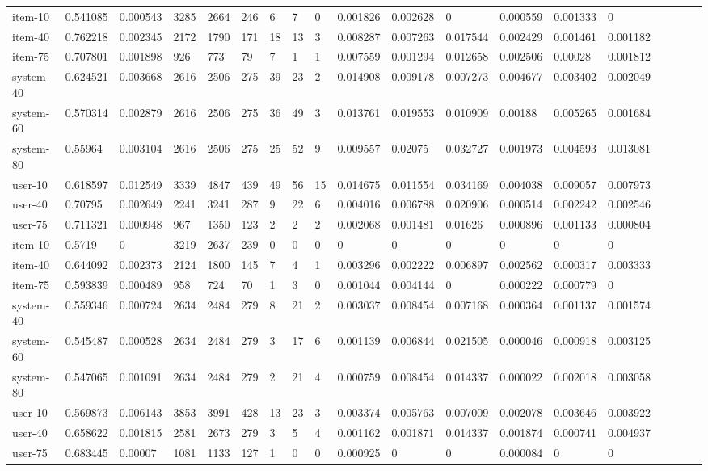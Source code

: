 \begin{table}
{\begin{tabular}{*{19}l}
item-10		&	0.541085 &	0.000543 &	3285 &	2664 &	246 &	6 &	7 &	0 &	0.001826 &	0.002628 &	0 &	0.000559 &	0.001333 &	0 &	 \\
item-40		&	0.762218 &	0.002345 &	2172 &	1790 &	171 &	18 &	13 &	3 &	0.008287 &	0.007263 &	0.017544 &	0.002429 &	0.001461 &	0.001182 &	 \\
item-75		&	0.707801 &	0.001898 &	926 &	773 &	79 &	7 &	1 &	1 &	0.007559 &	0.001294 &	0.012658 &	0.002506 &	0.00028 &	0.001812 &	 \\
system-40	&	0.624521 &	0.003668 &	2616 &	2506 &	275 &	39 &	23 &	2 &	0.014908 &	0.009178 &	0.007273 &	0.004677 &	0.003402 &	0.002049 &	 \\
system-60	&	0.570314 &	0.002879 &	2616 &	2506 &	275 &	36 &	49 &	3 &	0.013761 &	0.019553 &	0.010909 &	0.00188 &	0.005265 &	0.001684 &	 \\
system-80	&	0.55964  &	0.003104 &	2616 &	2506 &	275 &	25 &	52 &	9 &	0.009557 &	0.02075 &	0.032727 &	0.001973 &	0.004593 &	0.013081 &	 \\
user-10		&	0.618597 &	0.012549 &	3339 &	4847 &	439 &	49 &	56 &	15 &	0.014675 &	0.011554 &	0.034169 &	0.004038 &	0.009057 &	0.007973 &	 \\
user-40		&	0.70795  &	0.002649 &	2241 &	3241 &	287 &	9 &	22 &	6 &	0.004016 &	0.006788 &	0.020906 &	0.000514 &	0.002242 &	0.002546 &	 \\
user-75		&	0.711321 &	0.000948 &	967 &	1350 &	123 &	2 &	2 &	2 &	0.002068 &	0.001481 &	0.01626 &	0.000896 &	0.001133 &	0.000804 &	 \\

item-10		&	0.5719 &	0 &	3219 &	2637 &	239 &	0 &	0 &	0 &	0 &	0 &	0 &	0 &	0 &	0 &	 \\
item-40		&	0.644092 &	0.002373 &	2124 &	1800 &	145 &	7 &	4 &	1 &	0.003296 &	0.002222 &	0.006897 &	0.002562 &	0.000317 &	0.003333 &	 \\
item-75		&	0.593839 &	0.000489 &	958 &	724 &	70 &	1 &	3 &	0 &	0.001044 &	0.004144 &	0 &	0.000222 &	0.000779 &	0 &	 \\
system-40	&	0.559346 &	0.000724 &	2634 &	2484 &	279 &	8 &	21 &	2 &	0.003037 &	0.008454 &	0.007168 &	0.000364 &	0.001137 &	0.001574 &	 \\
system-60	&	0.545487 &	0.000528 &	2634 &	2484 &	279 &	3 &	17 &	6 &	0.001139 &	0.006844 &	0.021505 &	0.000046 &	0.000918 &	0.003125 &	 \\
system-80	&	0.547065 &	0.001091 &	2634 &	2484 &	279 &	2 &	21 &	4 &	0.000759 &	0.008454 &	0.014337 &	0.000022 &	0.002018 &	0.003058 &	 \\
user-10		&	0.569873 &	0.006143 &	3853 &	3991 &	428 &	13 &	23 &	3 &	0.003374 &	0.005763 &	0.007009 &	0.002078 &	0.003646 &	0.003922 &	 \\
user-40		&	0.658622 &	0.001815 &	2581 &	2673 &	279 &	3 &	5 &	4 &	0.001162 &	0.001871 &	0.014337 &	0.001874 &	0.000741 &	0.004937 &	 \\
user-75		&	0.683445 &	0.00007 &	1081 &	1133 &	127 &	1 &	0 &	0 &	0.000925 &	0 &	0 &	0.000084 &	0 &	0 &	 \\


\end{tabular}}
\end{table}

